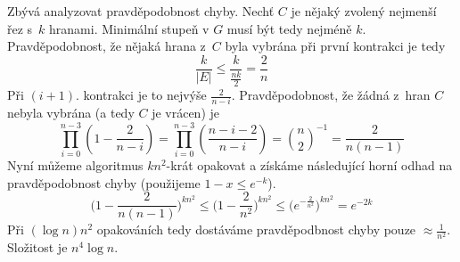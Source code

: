Zbývá analyzovat pravděpodobnost chyby. Nechť $C$ je nějaký zvolený
nejmenší řez s~$k$ hranami. Minimální stupeň v $G$ musí být tedy nejméně
$k$. Pravděpodobnost, že nějaká hrana z~$C$ byla vybrána při první
kontrakci je tedy
\[
    \frac{k}{\lvert E \rvert} \leq \frac{k}{\frac{nk}{2}} = \frac{2}{n}
\]
Při $(i+1)$. kontrakci je to nejvýše $\frac{2}{n-i}$. Pravděpodobnost,
že žádná z~hran $C$ nebyla vybrána (a tedy $C$ je vrácen) je
\[
    \prod_{i = 0}^{n - 3} (1 - \frac{2}{n-i}) =
    \prod_{i = 0}^{n - 3} (\frac{n - i - 2}{n-i}) =
    {n \choose 2}^{-1} =
    \frac{2}{n(n-1)}
\]
Nyní můžeme algoritmus $kn^2$-krát opakovat a získáme následující
horní odhad na pravděpodobnost chyby
(použijeme $1 - x \leq e^{-k}$).
\[
    \big (1 - \frac{2}{n(n-1)} \big )^{kn^2}
    \leq \big (1 - \frac{2}{n^2} \big )^{kn^2}
    \leq \big (e^{-\frac{2}{n^2}} \big )^{kn^2}
    = e^{-2k}
\]
Při $(\log n) n^2$ opakováních tedy dostáváme pravděpodbnost chyby
pouze $\approx \frac{1}{n^2}$. Složitost je $n^4 \log n$.
